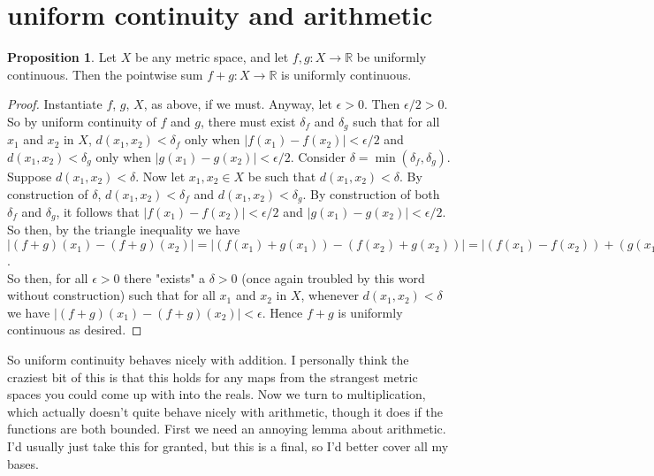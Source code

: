 \documentclass[11pt]{article}
\newcommand{\R}{\mathbb{R}}
\theoremstyle{definition}
\newtheorem{proposition}{Proposition}
\begin{document}
\section{uniform continuity and arithmetic}

\begin{proposition}

Let $X$ be any metric space, and let $f,g:X\to \R$ be uniformly continuous. Then the pointwise sum $f+g : X\to \R$ is uniformly continuous.  
\end{proposition}

\begin{proof}
Instantiate $f$, $g$, $X$, as above, if we must. Anyway, let $\epsilon > 0$. Then $\epsilon /2 > 0$. So by uniform continuity of $f$ and $g$, there must exist $\delta_f$ and $\delta_g$ such that for all $x_1$ and $x_2$ in $X$, $d(x_1, x_2)< \delta_f$ only when $ |f(x_1) - f(x_2)| < \epsilon/2 $ and $ d(x_1, x_2) < \delta_g $ only when $ |g(x_1) - g(x_2)| < \epsilon /2 $. Consider $\delta = \min(\delta_f,\delta_g)$. Suppose $d(x_1, x_2) < \delta$. Now let $x_1,x_2\in X$ be such that $ d(x_1, x_2) <\delta $. By construction of $\delta$, $ d(x_1, x_2) < \delta_f $ and $ d(x_1, x_2) < \delta_g $. By construction of both $\delta_f$ and $\delta_g$, it follows that $ |f(x_1) - f(x_2)| < \epsilon/2 $ and $ |g(x_1) - g(x_2)| < \epsilon/2 $. So then, by the triangle inequality we have $ |(f+g)(x_1) - (f+g)(x_2)| = |(f(x_1) + g(x_1)) - (f(x_2) + g(x_2))| = | (f(x_1) - f(x_2)) + (g(x_1) - g(x_2)) | \le |f(x_1) - f(x_2)| + (g(x_1) - g(x_2)| < \epsilon /2 + \epsilon /2 = \epsilon$. \\
So then, for all $\epsilon > 0$ there "exists" a $\delta> 0$ (once again troubled by this word without construction) such that for all $x_1$ and $x_2$ in $X$, whenever $ d(x_1, x_2) < \delta $ we have $ |(f+g)(x_1) - (f+g)(x_2)| < \epsilon $. Hence $f+g$ is uniformly continuous as desired.

\end{proof}

So uniform continuity behaves nicely with addition. I personally think the craziest bit of this is that this holds for any maps from the strangest metric spaces you could come up with into the reals. Now we turn to multiplication, which actually doesn't quite behave nicely with arithmetic, though it does if the functions are both bounded. First we need an annoying lemma about arithmetic. I'd usually just take this for granted, but this is a final, so I'd better cover all my bases. 
\end{document}

